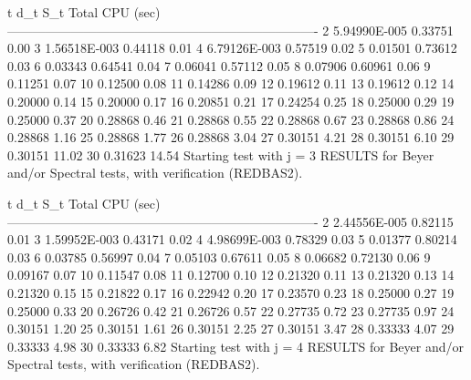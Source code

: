     t           d_t           S_t      Total CPU (sec)
 -------------------------------------------------------------------------
    2    5.94990E-005       0.33751        0.00
    3    1.56518E-003       0.44118        0.01
    4    6.79126E-003       0.57519        0.02
    5         0.01501       0.73612        0.03
    6         0.03343       0.64541        0.04
    7         0.06041       0.57112        0.05
    8         0.07906       0.60961        0.06
    9         0.11251                      0.07
   10         0.12500                      0.08
   11         0.14286                      0.09
   12         0.19612                      0.11
   13         0.19612                      0.12
   14         0.20000                      0.14
   15         0.20000                      0.17
   16         0.20851                      0.21
   17         0.24254                      0.25
   18         0.25000                      0.29
   19         0.25000                      0.37
   20         0.28868                      0.46
   21         0.28868                      0.55
   22         0.28868                      0.67
   23         0.28868                      0.86
   24         0.28868                      1.16
   25         0.28868                      1.77
   26         0.28868                      3.04
   27         0.30151                      4.21
   28         0.30151                      6.10
   29         0.30151                     11.02
   30         0.31623                     14.54
Starting test with j =  3
RESULTS for Beyer and/or Spectral tests, with verification (REDBAS2).


    t           d_t           S_t      Total CPU (sec)
 -------------------------------------------------------------------------
    2    2.44556E-005       0.82115        0.01
    3    1.59952E-003       0.43171        0.02
    4    4.98699E-003       0.78329        0.03
    5         0.01377       0.80214        0.03
    6         0.03785       0.56997        0.04
    7         0.05103       0.67611        0.05
    8         0.06682       0.72130        0.06
    9         0.09167                      0.07
   10         0.11547                      0.08
   11         0.12700                      0.10
   12         0.21320                      0.11
   13         0.21320                      0.13
   14         0.21320                      0.15
   15         0.21822                      0.17
   16         0.22942                      0.20
   17         0.23570                      0.23
   18         0.25000                      0.27
   19         0.25000                      0.33
   20         0.26726                      0.42
   21         0.26726                      0.57
   22         0.27735                      0.72
   23         0.27735                      0.97
   24         0.30151                      1.20
   25         0.30151                      1.61
   26         0.30151                      2.25
   27         0.30151                      3.47
   28         0.33333                      4.07
   29         0.33333                      4.98
   30         0.33333                      6.82
Starting test with j =  4
RESULTS for Beyer and/or Spectral tests, with verification (REDBAS2).


